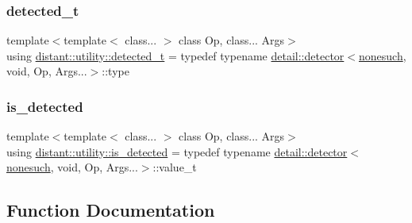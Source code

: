 \mbox{\label{namespacedistant_1_1utility_af5141f95b7f0dde0fff6a3642f3bf2ee}} 
\subsubsection{\texorpdfstring{detected\+\_\+t}{detected\_t}}
{\footnotesize\ttfamily template$<$template$<$ class... $>$ class Op, class... Args$>$ \\
using \mbox{\hyperlink{namespacedistant_1_1utility_af5141f95b7f0dde0fff6a3642f3bf2ee}{distant\+::utility\+::detected\+\_\+t}} = typedef typename \mbox{\hyperlink{structdistant_1_1utility_1_1detail_1_1detector}{detail\+::detector}}$<$\mbox{\hyperlink{structdistant_1_1utility_1_1nonesuch}{nonesuch}}, void, Op, Args...$>$\+::type}

\mbox{\label{namespacedistant_1_1utility_a640a6ceaf01c2de65e74899153c1b55a}} 
\subsubsection{\texorpdfstring{is\+\_\+detected}{is\_detected}}
{\footnotesize\ttfamily template$<$template$<$ class... $>$ class Op, class... Args$>$ \\
using \mbox{\hyperlink{namespacedistant_1_1utility_a640a6ceaf01c2de65e74899153c1b55a}{distant\+::utility\+::is\+\_\+detected}} = typedef typename \mbox{\hyperlink{structdistant_1_1utility_1_1detail_1_1detector}{detail\+::detector}}$<$\mbox{\hyperlink{structdistant_1_1utility_1_1nonesuch}{nonesuch}}, void, Op, Args...$>$\+::value\+\_\+t}



\subsection{Function Documentation}
\mbox{\label{namespacedistant_1_1utility_adaed2f252742877036ba3c936d9b436c}} 
